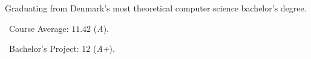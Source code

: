 Graduating from Denmark's most theoretical computer science bachelor's degree.

\medskip

\faGraduationCap\ Course Average: $11.42$ (\emph{A}).

\hspace{2.7pt}\faFileTextO\ \hspace{1.3pt}Bachelor's Project: $12$ (\emph{A+}).
